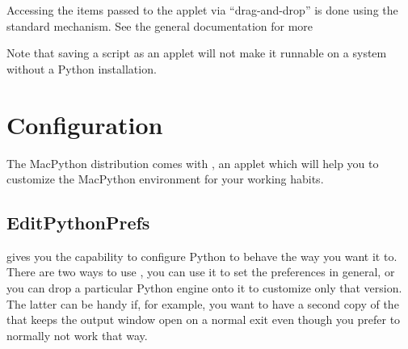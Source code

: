 Accessing the items passed to the applet via ``drag-and-drop'' is done
using the standard  mechanism. See the general
documentation for more

Note that saving a script as an applet will not make it runnable on a
system without a Python installation.

 
 

 
\section{Configuration \label{configuration}}

The MacPython distribution comes with , an
applet which will help you to customize the MacPython environment for
your working habits.
 
\subsection{EditPythonPrefs\label{EditPythonPrefs}}

 gives you the capability to configure Python
to behave the way you want it to.  There are two ways to use
, you can use it to set the preferences in
general, or you can drop a particular Python engine onto it to
customize only that version. The latter can be handy if, for example,
you want to have a second copy of the  that
keeps the output window open on a normal exit even though you prefer
to normally not work that way.

